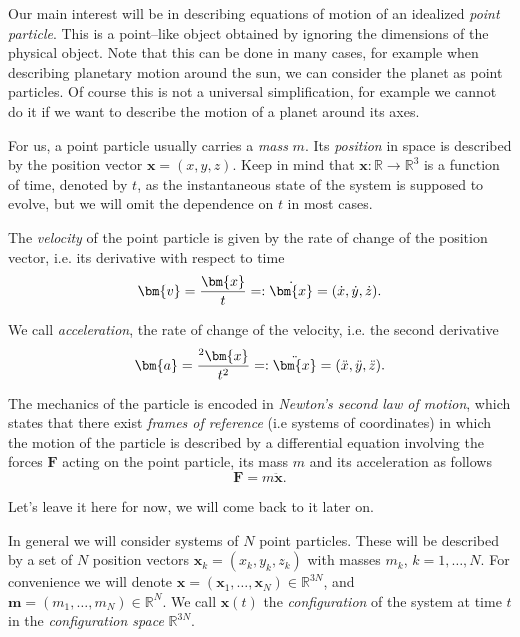 \documentclass[english,fontsize=11pt,paper=a5,oneside]{scrbook}
\newcommand{\R}{\mathbb{R}}
\newcommand{\bx}{\bm{x}}
\newcommand{\bv}{\bm{v}}
\let\d\relax
\DeclareMathOperator{\d}{d}
\newcommand{\der}[2]{\frac{\d{#1}}{\d{#2}}}
\theoremstyle{definition}
\begin{document}
Our main interest will be in describing equations of motion of an idealized \emph{point particle}.
This is a point--like object obtained by ignoring the dimensions of the physical object. Note that this can be done in many cases, for example when describing planetary motion around the sun, we can consider the planet as point particles.
Of course this is not a universal simplification, for example we cannot do it if we want to describe the motion of a planet around its axes.

For us, a point particle usually carries a \emph{mass} $m$.
Its \emph{position} in space is described by the position vector $\bx = (x, y ,z)$.
Keep in mind that $\bx : \R\to\R^3$ is a function of time, denoted by $t$, as the instantaneous state of the system is supposed to evolve, but we will omit the dependence on $t$ in most cases. 

The \emph{velocity} of the point particle is given by the rate of change of the position vector, i.e. its derivative with respect to time
\begin{equation}
    \bv = \der{\bx}{t} =: \dot{\bx} = (\dot{x}, \dot{y}, \dot{z}).
\end{equation}

We call \emph{acceleration}, the rate of change of the velocity, i.e. the second derivative
\begin{equation}
    \bm{a} = \der{^2\bx}{t^2} =: \ddot{\bx} = (\ddot{x}, \ddot{y}, \ddot{z}).
\end{equation}

\begin{tcolorbox}
The mechanics of the particle is encoded in \emph{Newton's second law of motion}, which states that there exist \emph{frames of reference} (i.e systems of coordinates) in which the motion of the particle is described by a differential equation involving the forces $\bm{F}$ acting on the point particle, its mass $m$ and its acceleration as follows
\begin{equation}\label{eq:newton}
    \bm F = m \ddot{\bx}.
\end{equation}
\end{tcolorbox}
Let's leave it here for now, we will come back to it later on.
\medskip

In general we will consider systems of $N$ point particles.
These will be described by a set of $N$ position vectors $\bx_k = (x_k, y_k ,z_k)$ with masses $m_k$, $k = 1, \ldots, N$.
For convenience we will denote $\bx = (\bx_1, \ldots, \bx_N)\in\R^{3N}$, and $\bm{m} = (m_1, \ldots, m_N)\in\R^N$.
We call $\bx(t)$ the \emph{configuration} of the system at time $t$ in the \emph{configuration space} $\R^{3N}$.
\end{document}

